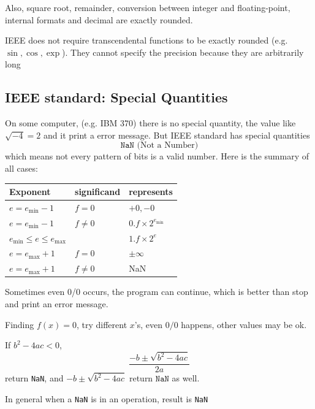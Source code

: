 Also, square root, remainder, conversion between
integer and floating-point, internal formats and
decimal are exactly rounded.
\vspace{0.5em}

IEEE does not require transcendental functions to
be exactly rounded (e.g. $\sin, \cos, \exp$). They cannot specify the precision because they
are arbitrarily long

\subsection{IEEE standard: Special Quantities}

On some computer, (e.g. IBM 370) there is no special quantity, the value like $\sqrt{-4} = 2$ and it print a error message. But IEEE standard has special quantities $$
\texttt{NaN} \text{ (Not a Number)}
$$
which means not every pattern of bits is a valid number. Here is the summary of all cases:

\begin{center}
    \begin{tabular}{lll}
        Exponent & significand & represents \\ \hline
        $e = e_{\min}-1$ & $f=0$ & $+0,-0$ \\
        $e = e_{\min}-1$ & $f\neq 0$ & 
        $0.f \times 2^{e_{\min}}$ \\
        $e_{\min} \leq e \leq e_{\max}$ & 
        & $1.f \times 2^e$ \\
        $e = e_{\max}+1$ & $f = 0$ & $\pm \infty$ \\
        $e = e_{\max}+1$ & $f \neq 0$ & NaN
    \end{tabular}
\end{center}

Sometimes even 0/0 occurs, the program can continue, which is better than stop and print an error message. 

\begin{eg}
    Finding $f(x) = 0$, try different $x$'s, even $0/0$ happens, other values may be ok.
\end{eg}

If $b^2 - 4ac < 0$, \[
    \frac{-b \pm \sqrt{b^2-4ac}}{2a}
\]
return \texttt{NaN}, and $-b \pm \sqrt{b^2-4ac}$ return $\texttt{NaN}$ as well.

\begin{remark}
    In general when a \texttt{NaN} is in an operation, result is \texttt{NaN}
\end{remark}

